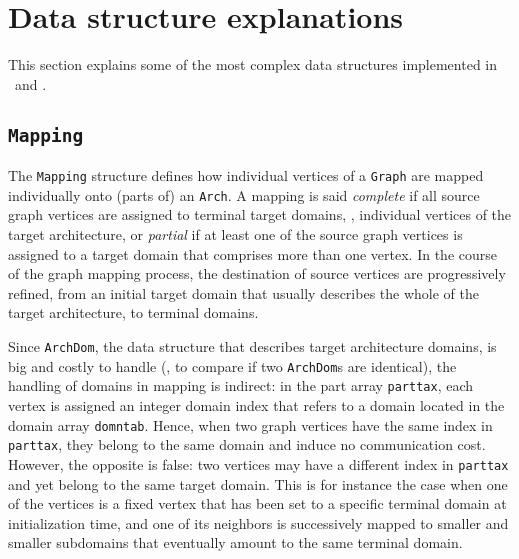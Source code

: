 
\section{Data structure explanations}
\label{sec-data}

This section explains some of the most complex data structures
implemented in \scotch\ and \ptscotch.

\subsection{\texttt{Mapping}}
\label{sec-data-mapping}

The \texttt{Mapping} structure defines how individual vertices of a
\texttt{Graph} are mapped individually onto (parts of) an
\texttt{Arch}. A mapping is said \textit{complete} if all source graph
vertices are assigned to terminal target domains, \ie, individual
vertices of the target architecture, or \textit{partial} if at least
one of the source graph vertices is assigned to a target domain that
comprises more than one vertex. In the course of the graph mapping
process, the destination of source vertices are progressively refined,
from an initial target domain that usually describes the whole of the
target architecture, to terminal domains.

Since \texttt{ArchDom}, the data structure that describes target
architecture domains, is big and costly to handle (\eg, to compare if
two \texttt{ArchDom}s are identical), the handling of domains in
mapping is indirect: in the part array \texttt{parttax}, each vertex
is assigned an integer domain index that refers to a domain located in
the domain array \texttt{domntab}. Hence, when two graph vertices have
the same index in \texttt{parttax}, they belong to the same domain and
induce no communication cost. However, the opposite is false: two
vertices may have a different index in \texttt{parttax} and yet belong
to the same target domain. This is for instance the case when one of
the vertices is a fixed vertex that has been set to a specific
terminal domain at initialization time, and one of its neighbors is
successively mapped to smaller and smaller subdomains that eventually
amount to the same terminal domain.

